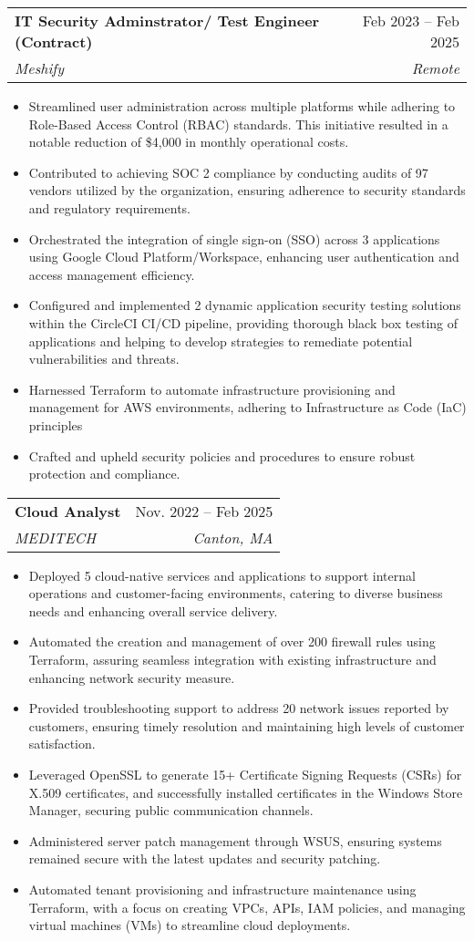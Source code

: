 \documentclass[letterpaper,10pt]{article}
\makeatletter
\newcommand{\resumeItem}[1]{
  \item\small{
    {#1 \vspace{-2pt}}
  }
}
\newcommand{\resumeSubheading}[4]{
  \vspace{-2pt}\item
    \begin{tabular*}{0.97\textwidth}[t]{l@{\extracolsep{\fill}}r}
      \textbf{#1} & #2 \\
      \textit{\small#3} & \textit{\small #4} \\
    \end{tabular*}\vspace{-7pt}
}
\newcommand{\resumeItemListStart}{\begin{itemize}}
\newcommand{\resumeItemListEnd}{\end{itemize}\vspace{-5pt}}
\makeatother
\begin{document}
  \resumeSubheading
      {IT Security Adminstrator/ Test Engineer (Contract)}{Feb 2023 -- Feb 2025}
      {Meshify}{Remote}
      \resumeItemListStart
        \resumeItem{Streamlined user administration across multiple platforms while adhering to Role-Based Access Control (RBAC) standards. This initiative resulted in a notable reduction of \$4,000 in monthly operational costs.}
        \resumeItem{Contributed to achieving SOC 2 compliance by conducting audits of 97 vendors utilized by the organization,  ensuring adherence to security standards and regulatory requirements.}
        \resumeItem{Orchestrated the integration of single sign-on (SSO) across 3 applications using Google Cloud Platform/Workspace, enhancing user authentication and access management efficiency.}
        \resumeItem{Configured and implemented 2 dynamic application security testing solutions within the CircleCI CI/CD pipeline, providing thorough black box testing of applications and helping to develop strategies to remediate potential vulnerabilities and threats.}
        \resumeItem{Harnessed Terraform to automate infrastructure provisioning and management for AWS environments, adhering to Infrastructure as Code (IaC) principles}
        \resumeItem{Crafted and upheld security policies and procedures to ensure robust protection and compliance.}
      \resumeItemListEnd
      


    \resumeSubheading
      {Cloud Analyst}{Nov. 2022 -- Feb 2025}
      {MEDITECH}{Canton, MA}
      \resumeItemListStart
        \resumeItem{Deployed 5 cloud-native services and applications to support internal operations and customer-facing environments, catering to diverse business needs and enhancing overall service delivery.}
        \resumeItem{Automated the creation and management of over 200 firewall rules using Terraform, assuring seamless integration with existing infrastructure and enhancing network security measure.}
        \resumeItem{Provided troubleshooting support to address 20 network issues reported by customers, ensuring timely resolution and maintaining high levels of customer satisfaction.}
        \resumeItem{Leveraged OpenSSL to generate 15+ Certificate Signing Requests (CSRs) for X.509 certificates, and successfully installed certificates in the Windows Store Manager, securing public communication channels.}
        \resumeItem{Administered server patch management through WSUS, ensuring systems remained secure with the latest updates and security patching.}
        \resumeItem{Automated tenant provisioning and infrastructure maintenance using Terraform, with a focus on creating VPCs, APIs, IAM policies, and managing virtual machines (VMs) to streamline cloud deployments.}
    \resumeItemListEnd
\end{document}
